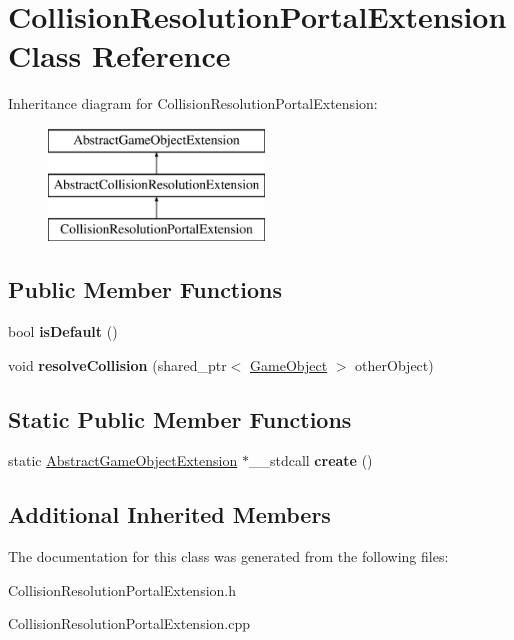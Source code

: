 \hypertarget{class_collision_resolution_portal_extension}{}\section{Collision\+Resolution\+Portal\+Extension Class Reference}
\label{class_collision_resolution_portal_extension}
Inheritance diagram for Collision\+Resolution\+Portal\+Extension\+:\begin{figure}[H]
\begin{center}
\leavevmode
\includegraphics[height=3.000000cm]{class_collision_resolution_portal_extension}
\end{center}
\end{figure}
\subsection*{Public Member Functions}
\begin{DoxyCompactItemize}
\item 
\mbox{\label{class_collision_resolution_portal_extension_a4bd3ee292b5a8bfd5b6fbb21175c2016}} 
bool {\bfseries is\+Default} ()
\item 
\mbox{\label{class_collision_resolution_portal_extension_a4e006318b6367308bd6be155211c8d9e}} 
void {\bfseries resolve\+Collision} (shared\+\_\+ptr$<$ \mbox{\hyperlink{class_game_object}{Game\+Object}} $>$ other\+Object)
\end{DoxyCompactItemize}
\subsection*{Static Public Member Functions}
\begin{DoxyCompactItemize}
\item 
\mbox{\label{class_collision_resolution_portal_extension_a8cf6352f6c005ddd81a170c5723b5adf}} 
static \mbox{\hyperlink{class_abstract_game_object_extension}{Abstract\+Game\+Object\+Extension}} $\ast$\+\_\+\+\_\+stdcall {\bfseries create} ()
\end{DoxyCompactItemize}
\subsection*{Additional Inherited Members}


The documentation for this class was generated from the following files\+:\begin{DoxyCompactItemize}
\item 
Collision\+Resolution\+Portal\+Extension.\+h\item 
Collision\+Resolution\+Portal\+Extension.\+cpp\end{DoxyCompactItemize}
